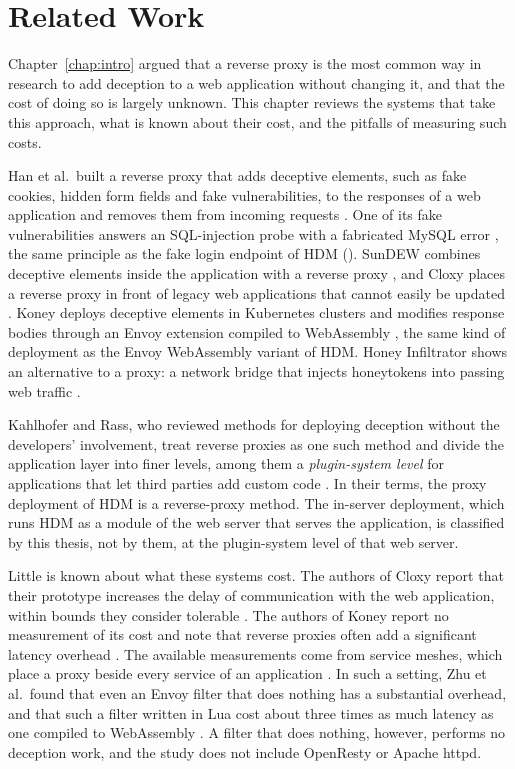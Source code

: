 \documentclass{rptuma}
\begin{document}
\chapter{Related Work}
\label{chap:AB.related}

Chapter~\ref{chap:intro} argued that a reverse proxy is the most common way in research to add
deception to a web application without changing it, and that the cost of doing so is largely
unknown. This chapter
reviews the systems that take this approach, what is known about their cost, and the pitfalls of
measuring such costs.

Han et al.\ built a reverse proxy that adds deceptive elements, such as fake cookies, hidden form
fields and fake vulnerabilities, to the responses of a web application and removes them from
incoming requests \cite{han2017evaluation}. One of its fake vulnerabilities answers an
SQL-injection probe with a fabricated MySQL error \cite{han2017evaluation}, the same principle as
the fake login endpoint of HDM (). SunDEW combines deceptive elements
inside the application with a reverse proxy \cite{sahin2020sundew}, and Cloxy places a reverse
proxy in front of legacy web applications that cannot easily be updated \cite{fraunholz2018cloxy}.
Koney deploys deceptive elements in Kubernetes clusters and modifies response bodies through an Envoy extension
compiled to WebAssembly \cite{kahlhofer2025koney}, the same kind of deployment as the Envoy
WebAssembly variant of HDM. Honey Infiltrator shows an alternative to a proxy: a network bridge
that injects honeytokens into passing web traffic \cite{reti2023honeyinfiltrator}.

Kahlhofer and Rass, who reviewed methods for deploying deception without the developers'
involvement, treat reverse proxies as one such method and divide the application layer into finer
levels, among them a \emph{plugin-system level} for applications that let third parties add custom
code \cite{kahlhofer2024application}. In their terms, the proxy deployment of HDM is a reverse-proxy
method. The in-server deployment, which runs HDM as a module of the web server that serves the
application, is classified by this thesis, not by them, at the plugin-system level of that web
server.

Little is known about what these systems cost. The authors of Cloxy report that their prototype
increases the delay of communication with the web application, within bounds they consider
tolerable \cite{fraunholz2018cloxy}. The authors of Koney report no measurement of its cost and
note that reverse proxies often add a significant latency overhead \cite{kahlhofer2025koney}. The available
measurements come from service meshes, which place a proxy beside every service of an application
\cite{kahlhofer2024application}. In such a setting, Zhu et al.\ found that even an Envoy filter that
does nothing has a substantial overhead, and that such a filter written in Lua cost about three
times as much latency as one compiled to WebAssembly \cite{zhu2023dissecting}. A filter that does
nothing, however, performs no deception work, and the study does not include OpenResty or Apache
httpd.
\end{document}
